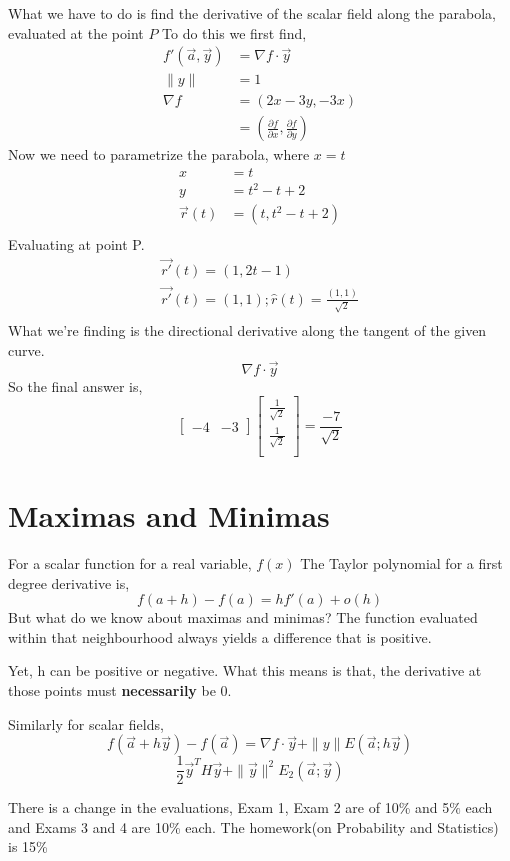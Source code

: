 \documentclass[twoside]{report}
\begin{document}
What we have to do is find the derivative of the scalar field along the parabola, evaluated at the point $P$
To do this we first find, 
\begin{align*}
	f'(\vec{a}, \vec{y}) &= \nabla f \cdot \vec{y} \\
	\|y\| &= 1 \\
	\nabla f &= (2x-3y,-3x) \\
		 &= (\frac{\partial f}{\partial x}, \frac{\partial f}{\partial y})
\end{align*}
Now we need to parametrize the parabola, where $x = t$
\begin{align*}
	x &= t \\
	y &= t^2 - t + 2\\
	\vec{r}(t) &= (t, t^2 - t + 2) \\
\end{align*}
Evaluating at point P.
\begin{align*}
	\vec{r'}(t) = (1,2t-1)\\
	\vec{r'}(t) = (1,1); \hat{r}(t) = \frac{(1,1)}{\sqrt{2}} \\
\end{align*}
What we're finding is the directional derivative along the tangent of the given curve. 
\[
	\nabla f \cdot \vec{y}
\]
So the final answer is,
\[ 
	\begin{bmatrix}
		-4 & -3
	\end{bmatrix}
	\begin{bmatrix}
		\frac{1}{\sqrt{2}}	\\
		\frac{1}{\sqrt{2}} \\
	\end{bmatrix}
	= \frac{-7}{\sqrt{2}}
\]
\section{Maximas and Minimas}
For a scalar function for a real variable, $f(x)$
The Taylor polynomial for a first degree derivative is,
\[ 
	f(a+h) - f(a) = hf'(a) + o(h)
\]
But what do we know about maximas and minimas? The function evaluated within that neighbourhood always yields a difference that is positive.

Yet, h can be positive or negative. What this means is that, the derivative at those points must \textbf{necessarily} be 0.

Similarly for scalar fields, 
\[ 
	f(\vec{a} + h\vec{y}) - f(\vec{a}) = \nabla f \cdot \vec{y} + \|y\|E(\vec{a};h\vec{y})
\]
\[
	\frac{1}{2} \vec{y}^T H \vec{y} + \|\vec{y}\|^2 E_2(\vec{a};\vec{y})
\]
\begin{note}
	There is a change in the evaluations, Exam 1, Exam 2 are of 10\% and 5$\%$ each and Exams 3 and 4 are 10\% each. The homework(on Probability and Statistics) is 15\%
\end{note}
\end{document}
